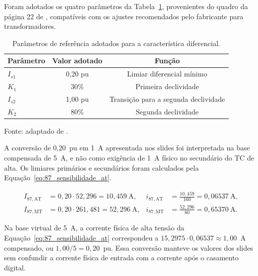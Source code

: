 Foram adotados os quatro parâmetros da Tabela~\ref{tab:87_parametros_slides}, provenientes do quadro da página 22 de \cite{cysne2026protecao}, compatíveis com os ajustes recomendados pelo fabricante para transformadores.

\begin{table}[htbp]
    \centering
    \caption{Parâmetros de referência adotados para a característica diferencial.}
    \label{tab:87_parametros_slides}
    \begin{tabular}{lcc}
        \hline
        \textbf{Parâmetro} & \textbf{Valor adotado} & \textbf{Função}\\
        \hline
        $I_{s1}$ & 0,20 pu & Limiar diferencial mínimo\\
        $K_1$ & 30\% & Primeira declividade\\
        $I_{s2}$ & 1,00 pu & Transição para a segunda declividade\\
        $K_2$ & 80\% & Segunda declividade\\
        \hline
    \end{tabular}
    \par\vspace{2pt}
    {\small Fonte: adaptado de \cite{cysne2026protecao}.}
\end{table}

A conversão de 0,20~pu em 1~A apresentada nos slides foi interpretada na base compensada de 5~A, e não como exigência de 1~A físico no secundário do TC de alta. Os limiares primários e secundários foram calculados pela Equação~\eqref{eq:87_sensibilidade_at}.

\begin{equation}
    \begin{aligned}
        I_{\mathrm{87,AT}}&=0{,}20\cdot52{,}296=10{,}459~\mathrm{A},
        &i_{\mathrm{87,AT}}&=\frac{10{,}459}{160}=0{,}06537~\mathrm{A},\\
        I_{\mathrm{87,MT}}&=0{,}20\cdot261{,}481=52{,}296~\mathrm{A},
        &i_{\mathrm{87,MT}}&=\frac{52{,}296}{80}=0{,}65370~\mathrm{A}.
    \end{aligned}
    \label{eq:87_sensibilidade_at}
\end{equation}

Na base virtual de 5~A, a corrente física de alta tensão da Equação~\eqref{eq:87_sensibilidade_at} correspondeu a $15{,}2975\cdot0{,}06537\approx1{,}00$~A compensado, ou $1{,}00/5=0{,}20$~pu. Essa conversão manteve os valores dos slides sem confundir a corrente física de entrada com a corrente após o casamento digital.

